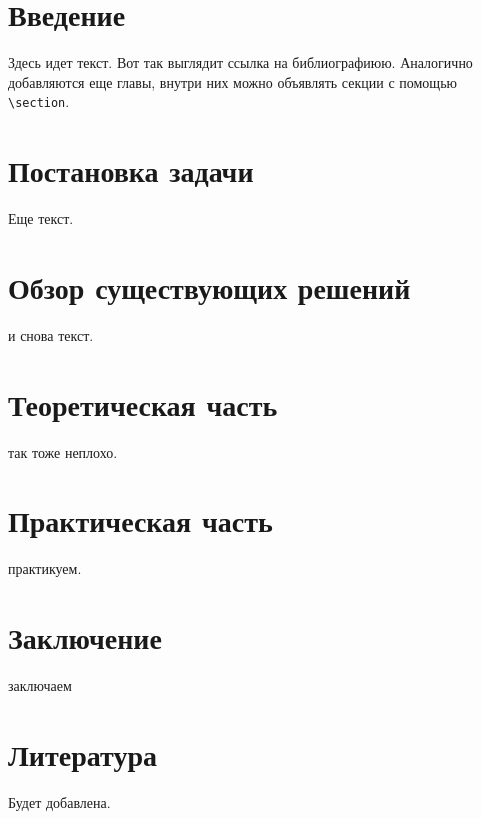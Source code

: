 \documentclass{mipt-thesis-bs}
\begin{document}
\mainmatter


\chapter{Введение}

Здесь идет текст. Вот так выглядит ссылка на библиографиюю. Аналогично добавляются еще главы, внутри них можно объявлять секции с помощью \verb|\section|.



\chapter{Постановка задачи}
Еще текст.

\chapter{Обзор существующих решений}
и снова текст.


\chapter{Теоретическая часть}
так тоже неплохо.

\chapter{Практическая часть}
практикуем.

\chapter{Заключение}
заключаем

\backmatter


\chapter{Литература}

Будет добавлена.
\end{document}
